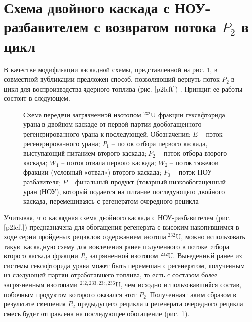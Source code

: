 \section{Схема двойного каскада с НОУ-разбавителем с возвратом потока $P_2$ в цикл}

В качестве модификации каскадной схемы, представленной на рис. \ref{P2utilizationRing}, в совместной публикации предложен способ, позволяющий вернуть поток $P_2$ в цикл для воспроизводства ядерного топлива (рис. \ref{p2left}) \cite{nevinicaToplivnyyCiklLegkovodnogo2019, nevinicaSposobIzotopnogoVosstanovleniya2019}. Принцип ее работы состоит в следующем.


\begin{figure}[ht]
    \caption{Схема передачи загрязненной изотопом $^{232}$U фракции гексафторида урана в двойном каскаде от первой партии дообогащенного регенерированного урана к последующей. Обозначения: $E$ -- поток регенерированного урана; $P_1$ -- поток отбора первого каскада, выступающий питанием второго каскада; $P_2$ -- поток отбора второго каскада; $W_1$ -- поток отвала первого каскада; $W_2$ -- поток тяжелой фракции (условный «отвал») второго каскада; $P_0$ -- поток НОУ-разбавителя; $P$ -- финальный продукт (товарный низкообогащенный уран (НОУ), который подается на питание последующего двойного каскада, перемешиваясь с регенератом очередного рецикла}\label{P2utilizationRing}
\end{figure}

Учитывая, что каскадная схема двойного каскада с НОУ-разбавителем (рис. \ref{p2left}) предназначена для обогащения регенерата с высоким накопившимся в ходе серии пройденых рециклов содержанием изотопа $^{232}$U, можно использовать такую каскадную схему для вовлечения ранее полученного в потоке отбора второго каскада фракции $P_2$ загрязненной изотопом $^{232}$U. Выведенный ранее из системы гексафторида урана может быть перемешан с регенератом, полученным из следующей партии отработавшего топлива, то есть с составом более загрязненным изотопами $^{232,233,234,236}$U, чем исходно использовавшийся состав, побочным продуктом которого оказался этот $P_2$. Полученная таким образом в результате смешения $P_2$ предыдущего рецикла и регенерата очередного рецикла смесь будет отправлена на последующее обогащение (рис. \ref{P2utilizationRing}).

